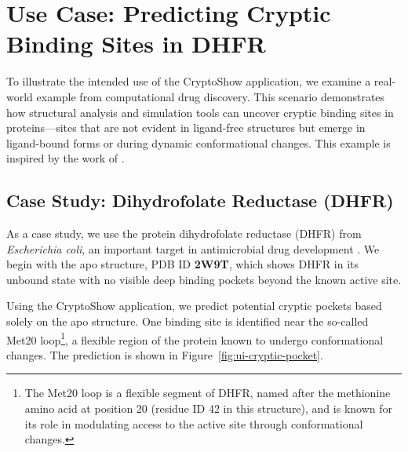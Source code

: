 \section{Use Case: Predicting Cryptic Binding Sites in DHFR}
\label{sec:use-case}

To illustrate the intended use of the CryptoShow application, we examine a real-world example from computational drug discovery. This scenario demonstrates how structural analysis and simulation tools can uncover cryptic binding sites in proteins—sites that are not evident in ligand-free structures but emerge in ligand-bound forms or during dynamic conformational changes. This example is inspired by the work of \citet{meller2023predicting}.

\subsection{Case Study: Dihydrofolate Reductase (DHFR)}
\label{subsec:dhfr-example}

As a case study, we use the protein dihydrofolate reductase (DHFR) from \textit{Escherichia coli}, an important target in antimicrobial drug development \cite{heaslet2009structural}. We begin with the apo structure, PDB ID \textbf{2W9T}, which shows DHFR in its unbound state with no visible deep binding pockets beyond the known active site.

Using the CryptoShow application, we predict potential cryptic pockets based solely on the apo structure. One binding site is identified near the so-called Met20 loop\footnote{The Met20 loop is a flexible segment of DHFR, named after the methionine amino acid at position 20 (residue ID 42 in this structure), and is known for its role in modulating access to the active site through conformational changes.}, a flexible region of the protein known to undergo conformational changes. The prediction is shown in Figure~\ref{fig:ui-cryptic-pocket}.

